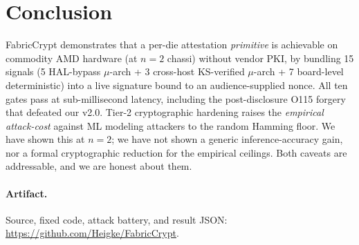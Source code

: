 \documentclass[11pt,letterpaper]{article}
\begin{document}
\section{Conclusion}

FabricCrypt demonstrates that a per-die attestation \emph{primitive}
is achievable on commodity AMD hardware (at $n=2$ chassi) without
vendor PKI, by bundling 15 signals (5 HAL-bypass $\mu$-arch + 3
cross-host KS-verified $\mu$-arch + 7 board-level deterministic) into
a live signature bound to an audience-supplied nonce. All ten gates
pass at sub-millisecond latency, including the post-disclosure O115
forgery that defeated our v2.0. Tier-2 cryptographic hardening raises
the \emph{empirical attack-cost} against ML modeling attackers to the
random Hamming floor. We have shown this at $n=2$; we have not shown
a generic inference-accuracy gain, nor a formal cryptographic
reduction for the empirical ceilings. Both caveats are addressable,
and we are honest about them.

\paragraph{Artifact.} Source, fixed code, attack battery, and
result JSON: \url{https://github.com/Heigke/FabricCrypt}.



\end{document}
